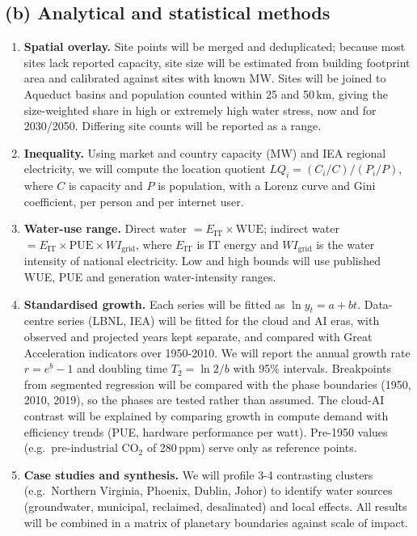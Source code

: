 \documentclass[10pt,a4paper]{article}
\begin{document}
\subsection*{(b) Analytical and statistical methods}
\begin{enumerate}[label=\arabic*.]
  \item \textbf{Spatial overlay.} Site points will be merged and deduplicated; because most sites lack reported capacity, site size will be estimated from building footprint area and calibrated against sites with known MW. Sites will be joined to Aqueduct basins and population counted within 25 and 50\,km, giving the size-weighted share in high or extremely high water stress, now and for 2030/2050. Differing site counts will be reported as a range.
  \item \textbf{Inequality.} Using market and country capacity (MW) and IEA regional electricity, we will compute the location quotient $LQ_i = (C_i/C)/(P_i/P)$, where $C$ is capacity and $P$ is population, with a Lorenz curve and Gini coefficient, per person and per internet user.
  \item \textbf{Water-use range.} Direct water $=E_{\mathrm{IT}}\times\mathrm{WUE}$; indirect water $=E_{\mathrm{IT}}\times\mathrm{PUE}\times WI_{\mathrm{grid}}$, where $E_{\mathrm{IT}}$ is IT energy and $WI_{\mathrm{grid}}$ is the water intensity of national electricity. Low and high bounds will use published WUE, PUE and generation water-intensity ranges.
  \item \textbf{Standardised growth.} Each series will be fitted as $\ln y_t = a + bt$. Data-centre series (LBNL, IEA) will be fitted for the cloud and AI eras, with observed and projected years kept separate, and compared with Great Acceleration indicators over 1950-2010. We will report the annual growth rate $r = e^{b}-1$ and doubling time $T_2 = \ln 2/b$ with 95\% intervals. Breakpoints from segmented regression will be compared with the phase boundaries (1950, 2010, 2019), so the phases are tested rather than assumed. The cloud-AI contrast will be explained by comparing growth in compute demand with efficiency trends (PUE, hardware performance per watt). Pre-1950 values (e.g.\ pre-industrial CO$_2$ of 280\,ppm) serve only as reference points.
  \item \textbf{Case studies and synthesis.} We will profile 3-4 contrasting clusters (e.g.\ Northern Virginia, Phoenix, Dublin, Johor) to identify water sources (groundwater, municipal, reclaimed, desalinated) and local effects. All results will be combined in a matrix of planetary boundaries against scale of impact.
\end{enumerate}
\end{document}
